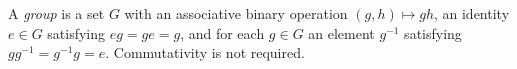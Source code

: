 
A \emph{group} is a set $G$ with an associative binary operation $(g,h)\mapsto gh$, an identity $e\in G$ satisfying $eg=ge=g$, and for each $g\in G$ an element $g^{-1}$ satisfying $gg^{-1}=g^{-1}g=e$. Commutativity is not required.
